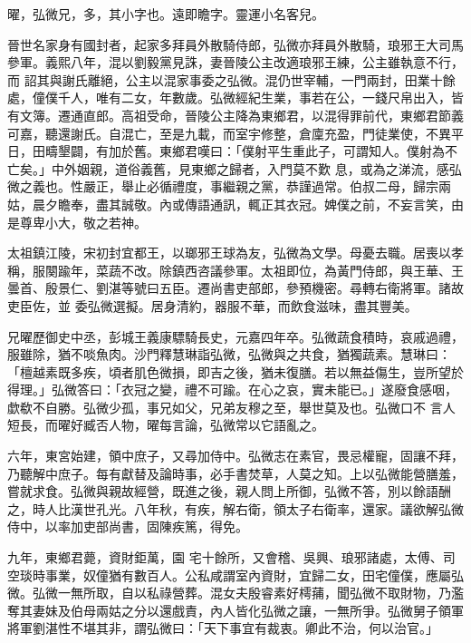 \begin{pinyinscope}
 曜，弘微兄，多，其小字也。遠即瞻字。靈運小名客兒。



 晉世名家身有國封者，起家多拜員外散騎侍郎，弘微亦拜員外散騎，琅邪王大司馬參軍。義熙八年，混以劉毅黨見誅，妻晉陵公主改適琅邪王練，公主雖執意不行，而
 詔其與謝氏離絕，公主以混家事委之弘微。混仍世宰輔，一門兩封，田業十餘處，僮僕千人，唯有二女，年數歲。弘微經紀生業，事若在公，一錢尺帛出入，皆有文簿。遷通直郎。高祖受命，晉陵公主降為東鄉君，以混得罪前代，東鄉君節義可嘉，聽還謝氏。自混亡，至是九載，而室宇修整，倉廩充盈，門徒業使，不異平日，田疇墾闢，有加於舊。東鄉君嘆曰：「僕射平生重此子，可謂知人。僕射為不亡矣。」中外姻親，道俗義舊，見東鄉之歸者，入門莫不歎
 息，或為之涕流，感弘微之義也。性嚴正，舉止必循禮度，事繼親之黨，恭謹過常。伯叔二母，歸宗兩姑，晨夕瞻奉，盡其誠敬。內或傳語通訊，輒正其衣冠。婢僕之前，不妄言笑，由是尊卑小大，敬之若神。



 太祖鎮江陵，宋初封宜都王，以瑯邪王球為友，弘微為文學。母憂去職。居喪以孝稱，服闋踰年，菜蔬不改。除鎮西咨議參軍。太祖即位，為黃門侍郎，與王華、王曇首、殷景仁、劉湛等號曰五臣。遷尚書吏部郎，參預機密。尋轉右衛將軍。諸故吏臣佐，並
 委弘微選擬。居身清約，器服不華，而飲食滋味，盡其豐美。



 兄曜歷御史中丞，彭城王義康驃騎長史，元嘉四年卒。弘微蔬食積時，哀戚過禮，服雖除，猶不啖魚肉。沙門釋慧琳詣弘微，弘微與之共食，猶獨蔬素。慧琳曰：「檀越素既多疾，頃者肌色微損，即吉之後，猶未復膳。若以無益傷生，豈所望於得理。」弘微答曰：「衣冠之變，禮不可踰。在心之哀，實未能已。」遂廢食感咽，歔欷不自勝。弘微少孤，事兄如父，兄弟友穆之至，舉世莫及也。弘微口不
 言人短長，而曜好臧否人物，曜每言論，弘微常以它語亂之。



 六年，東宮始建，領中庶子，又尋加侍中。弘微志在素官，畏忌權寵，固讓不拜，乃聽解中庶子。每有獻替及論時事，必手書焚草，人莫之知。上以弘微能營膳羞，嘗就求食。弘微與親故經營，既進之後，親人問上所御，弘微不答，別以餘語酬之，時人比漢世孔光。八年秋，有疾，解右衛，領太子右衛率，還家。議欲解弘微侍中，以率加吏部尚書，固陳疾篤，得免。



 九年，東鄉君薨，資財鉅萬，園
 宅十餘所，又會稽、吳興、琅邪諸處，太傅、司空琰時事業，奴僮猶有數百人。公私咸謂室內資財，宜歸二女，田宅僮僕，應屬弘微。弘微一無所取，自以私祿營葬。混女夫殷睿素好樗蒱，聞弘微不取財物，乃濫奪其妻妹及伯母兩姑之分以還戲責，內人皆化弘微之讓，一無所爭。弘微舅子領軍將軍劉湛性不堪其非，謂弘微曰：「天下事宜有裁衷。卿此不治，何以治官。」




\end{pinyinscope}

